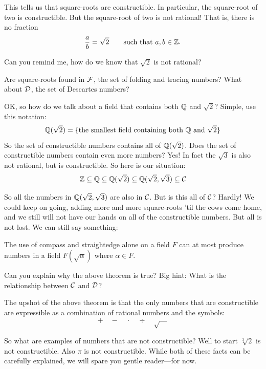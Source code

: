 This tells us that square-roots are constructible. In particular, the square-root of two is constructible. But the square-root of two is not rational! That is, there is no fraction
\[
\frac{a}{b} = \sqrt{2} \qquad \text{such that $a,b\in\mathbb Z$}.
\]

\begin{question} 
Can you remind me, how do we know that $\sqrt{2}$ is not rational?
\end{question}
\QM

\begin{question} 
Are square-roots found in $\mathcal F$, the set of folding and tracing numbers? What about
$\mathcal D$, the set of Descartes numbers?
\end{question}
\QM

OK, so how do we talk about a field that contains both $\mathbb Q$ and
$\sqrt{2}$? Simple, use this notation:
\[
\mathbb Q(\sqrt{2})= \{\text{the smallest field containing both $\mathbb Q$ and $\sqrt{2}$}\}
\]
So the set of constructible numbers contains all of $\mathbb Q( \sqrt{2} )$. Does the set of constructible numbers contain even more numbers? Yes! In fact the $\sqrt{3}$ is also not rational, but is constructible. So here is our situation:
\[
\mathbb Z \subseteq \mathbb Q \subseteq \mathbb Q(\sqrt{2}) \subseteq \mathbb Q(\sqrt{2},\sqrt{3}) \subseteq \mathcal C
\]

So all the numbers in $\mathbb Q(\sqrt{2},\sqrt{3})$ are also in $\mathcal C$. But is
this all of $\mathcal C$? Hardly! We could keep on going, adding more and more
square-roots 'til the cows come home, and we still will not have our
hands on all of the constructible numbers. But all is not lost. We can
still say something:


\begin{theorem} 
The use of compass and straightedge alone on a field $F$ can at most
produce numbers in a field $F( \sqrt{\alpha} )$ where $\alpha \in F$.
\end{theorem}

\begin{question} Can you explain why the above theorem is true? Big hint: What is the relationship between $\mathcal C$ and $\mathcal D$?
\end{question}
\QM


The upshot of the above theorem is that the only numbers that are
constructible are expressible as a combination of rational numbers and
the symbols:
\[
+\quad -\quad \cdot\quad \div \quad \sqrt{\hspace{1em}}
\]

So what are examples of numbers that are not constructible? Well to
start $\sqrt[3]{2}$ is not constructible. Also $\pi$ is not
constructible. While both of these facts can be carefully explained,
we will spare you gentle reader---for now.

